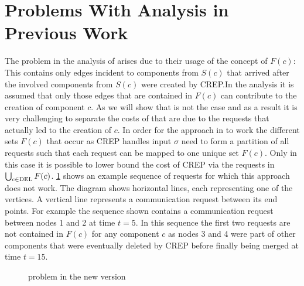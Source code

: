 \documentclass[xcolor=dvipsnames, tikz, 11pt]{article}
\newcommand{\nl}{\newline}
\newcommand{\crep}{C{\scriptsize REP}}
\newcommand{\del}{\text{\scriptsize DEL}}
\newcommand{\opt}{\text{O{\scriptsize PT}}}
\newcommand{\request}[3]{\draw (axis cs:#3,#1) -- node[left]{} (axis cs:#3,#2);}
\theoremstyle{definition}
\begin{document}
	
	\section{Problems With Analysis in Previous Work}
	\label{flawsSection}
	The problem in the analysis of \cite{Avin2015a} arises due to their usage of the concept of $F(c)$: This contains only edges incident to components from $S(c)$ that arrived after the involved components from $S(c)$ were created by \crep{}.In the analysis it is assumed that only those edges that are contained in $F(c)$ can contribute to the creation of component $c$. As we will show that is not the case and as a result it is very challenging to separate the costs of \opt{} that are due to the requests that actually led to the creation of $c$.\nl
	In order for the approach in \cite{Avin2015a} to work the different sets $F(c)$ that occur as \crep{} handles input $\sigma$ need to form a partition of all requests such that each request can be mapped to one unique set $F(c)$. Only in this case it is possible to lower bound the cost of \crep{} via the requests in $\bigcup_{c\in\del{}}F(c)$.\nl
	\cref{exNewCrep} shows an example sequence of requests for which this approach does not work. The diagram shows horizontal lines, each representing one of the vertices. A vertical line represents a communication request between its end points. For example the sequence shown contains a communication request between nodes 1 and 2 at time $t=5$.\nl
	In this sequence the first two requests are not contained in $F(c)$ for any component $c$ as nodes 3 and 4 were part of other components that were eventually deleted by \crep{} before finally being merged at time $t=15$.\nl
	
	\begin{figure}
		\caption{problem in the new version}\label{exNewCrep}	
	\end{figure}
	
\end{document}
